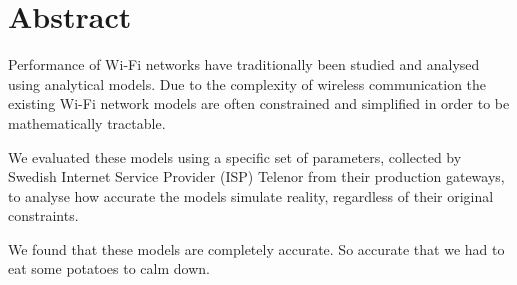 
\chapter*{Abstract}

Performance of Wi-Fi networks have traditionally been studied and analysed using analytical models. Due to the complexity of wireless communication the existing Wi-Fi network models are often constrained and simplified in order to be mathematically tractable.

We evaluated these models using a specific set of parameters, collected by Swedish Internet Service Provider (ISP) Telenor from their production gateways, to analyse how accurate the models simulate reality, regardless of their original constraints.\cite{bianchi}

We found that these models are completely accurate. So accurate that we had to eat some potatoes to calm down.